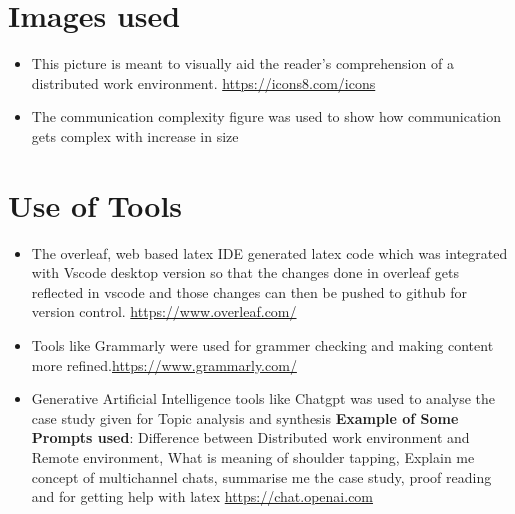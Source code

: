 \documentclass{llncs}
\begin{document}
\begin{subappendices}
\renewcommand{\thesection}{\Alph{section}}
\section{Images used}
\begin{itemize}
    \item This picture is meant to visually aid the reader's comprehension of a distributed work environment. \url{https://icons8.com/icons}
    \item The communication complexity figure was used to show how communication gets complex with increase in  size
\end{itemize}
\section{Use of Tools}
\begin{itemize}
    \item The overleaf, web based latex IDE generated latex code which was integrated with Vscode desktop version so that the changes done in overleaf gets reflected in vscode and those changes can then be pushed to github for version control. \url{https://www.overleaf.com/} 
    \item Tools like Grammarly were used for grammer checking and making content more refined.\url{https://www.grammarly.com/}
    \item Generative Artificial Intelligence tools like Chatgpt was used to analyse the case study given for Topic analysis and synthesis \textbf{Example of Some Prompts used}: Difference between Distributed work environment and Remote environment, What is meaning of shoulder tapping, Explain me concept of multichannel chats, summarise me the case study, proof reading and for getting help with latex \url{https://chat.openai.com}
\end{itemize}

\end{subappendices}
\end{document}
